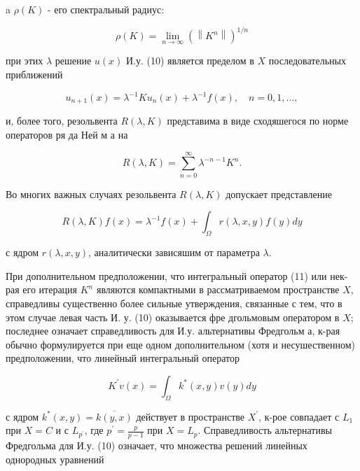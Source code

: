 \documentclass[10pt]{article}
\begin{document}
a $\rho(K)$ - его спектральный радиус:



\[

\rho(K)=\lim _{n \rightarrow \infty}\left(\left\|K^{n}\right\|\right)^{1 / n}

\]



при этих $\lambda$ решение $u(x)$ И.у. (10) является пределом в $X$ последовательных приближений



\[

u_{n+1}(x)=\lambda^{-1} K u_{n}(x)+\lambda^{-1} f(x), \quad n=0,1, \ldots,

\]



и, более того, резольвента $R(\lambda, K)$ представима в виде сходяшегося по норме операторов ря да Ней м а на



\[

R(\lambda, K)=\sum_{n=0}^{\infty} \lambda^{-n-1} K^{n} .

\]



Во многих важных случаях резольвента $R(\lambda, K)$ допускает представление



\[

R(\lambda, K) f(x)=\lambda^{-1} f(x)+\int_{\Omega} r(\lambda, x, y) f(y) d y

\]



с ядром $r(\lambda, x, y)$, аналитически зависяшим от параметра $\lambda$.



При дополнительном предположении, что интегральный оператор (11) или нек-рая его итерация $K^{n}$ являются компактными в рассматриваемом пространстве $X$, справедливы существенно более сильные утверждения, связанные с тем, что в этом случае левая часть И. у. (10) оказывается фре дгольмовым оператором в $X$; последнее означает справедливость для И.у. альтернативы Фредгольм а, к-рая обычно формулируется при еще одном дополнительном (хотя и несушественном) предположении, что линейный интегральный оператор



\[

K^{\prime} v(x)=\int_{\Omega} k^{*}(x, y) v(y) d y

\]



с ядром $k^{*}(x, y)=\overline{k(y, x)}$ действует в пространстве $X^{\prime}$, к-рое совпадает с $L_{1}$ при $X=C$ и с $L_{p^{\prime}}$, где $p^{\prime}=\frac{p}{p-1}$ при $X=L_{p}$. Справедливость альтернативы Фредгольма для И.у. (10) означает, что множества решений линейных однородных уравнений
\end{document}
